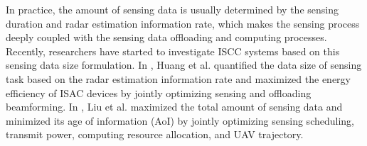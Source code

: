 \documentclass[10pt,journal,compsoc]{IEEEtran}
\begin{document}
In practice, the amount of sensing data is usually determined by the sensing duration and radar estimation information rate, which makes the sensing process deeply coupled with the sensing data offloading and computing processes. Recently, researchers have started to investigate ISCC systems based on this sensing data size formulation\cite{Related works:ISCC-PRO:WCL:Energy-Efficient-Integrated, Related works:ISCC-PRO:TWC:Joint-Sensing-And}.
In \cite{Related works:ISCC-PRO:WCL:Energy-Efficient-Integrated}, Huang et al. quantified the data size of sensing task based on the radar estimation information rate and maximized the energy efficiency of ISAC devices by jointly optimizing sensing and offloading beamforming. 
In \cite{Related works:ISCC-PRO:TWC:Joint-Sensing-And}, Liu et al. maximized the total amount of sensing data and minimized its age of information (AoI) by jointly optimizing sensing scheduling, transmit power, computing resource allocation, and UAV trajectory.
\end{document}
